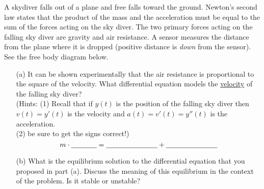 \begin{problem}
A skydiver falls out of a plane and free falls toward the ground.
Newton's second law states that the product of the mass and the acceleration
must be equal to the sum of the forces acting on the sky diver.  The two primary forces acting
on the falling sky diver are gravity and air resistance.  A sensor measures the
distance from the plane where it is dropped (positive distance is {\it down} from the
sensor). See the free body diagram below.

\begin{center}
\end{center}

\begin{enumerate}
    \item[(a)] It can be shown experimentally that the air resistance is proportional to the
    square of the velocity.  What differential equation models the \underline{velocity} of
    the falling sky diver? \\(Hints: (1) Recall that if $y(t)$ is the position of the
    falling sky diver then $v(t) = y'(t)$ is the velocity and $a(t) = v'(t) = y''(t)$
    is the acceleration.  \\(2) be sure to get the signs correct!)
    \[ m \cdot \underline{\hspace{0.5in}} = \underline{\hspace{1in}} +
        \underline{\hspace{1in}} \]

    \item[(b)] What is the equilibrium solution to the differential equation that you
    proposed in part (a). Discuss the meaning of this equilibrium in the context of the
    problem. Is it stable or unstable? 



\end{enumerate}
\end{problem}
